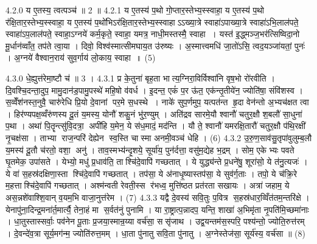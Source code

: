 4.2.0
य ए॒तस्य॒ त्वत्पञ्च॑ ॥ 2 ॥
4.2.1
य ए॒तस्य॑ प॒थो गो॒प्तार॒स्तेभ्य॒स्स्वाहा॒ य ए॒तस्य॑ प॒थो र॑क्षि॒तार॒स्तेभ्य॒स्स्वाहा॒ य ए॒तस्य॑ प॒थो॑भिऽर॑क्षि॒तार॒स्तेभ्य॒स्स्वाहाऽऽख्या॒त्रे स्वाहा॑ऽपाख्या॒त्रे स्वाहा॑ऽभि॒लाल॑पते॒ स्वाहा॑ऽप॒लाल॑पते॒ स्वाहा॒ऽग्नये॑ कर्म॒कृते॒ स्वाहा॒ यमत्र॒ नाधी॒मस्तस्मै॒ स्वाहा । यस्त॑ इ॒द्ध्मञ्ज॒भर॑त्सिष्विदा॒नो मू॒र्धान॑व्वाँत॒ तप॑ते त्वा॒या । दिवो॒ विश्व॑स्मात्सीमघाय॒त उ॑रुष्यः । अ॒स्मात्त्वमधि॑ जा॒तो॑ऽसि॒ त्वद॒यञ्जा॑यतां॒ पुनः॑ । अ॒ग्नये॑ वैश्वान॒राय॑ सुव॒र्गाय॑ लो॒काय॒ स्वाहा ॥ (5)
\anuvakamend

4.3.0
धे॒ह्युत्त॑रेमा॒ष्टौ च॑ ॥ 3 ।
4.3.1
प्र के॒तुना॑ बृह॒ता भात्य॒ग्निरा॒विर्विश्वा॑नि वृष॒भो रो॑रवीति । दि॒वश्चि॒दन्ता॒दुप॒ मामु॒दान॑ड॒पामु॒पस्थे॑ महि॒षो व॑वर्ध । इ॒दन्त॒ एकं॑ प॒र ऊ॑त॒ एक॑न्तृ॒तीये॑न॒ ज्योति॑षा॒ संवि॑शस्व । स॒व्वेँश॑नस्त॒नुवै॒ चारु॑रेधि प्रि॒यो दे॒वानां पर॒मे स॒धस्थे । नाके॑ सुप॒र्णमुप॒ यत्पत॑न्त हृ॒दा वेन॑न्तो अ॒भ्यच॑क्षत त्वा । हिर॑ण्यपक्ष॒व्वँरु॑णस्य दू॒तं य॒मस्य॒ योनौ॑ शकु॒नं भु॑र॒ण्युम् । अति॑द्रव सारमे॒यौ श्वानौ॑ चतुर॒क्षौ श॒बलौ॑ सा॒धुना॑ प॒था । अथा॑ पि॒तॄन्त्सु॑वि॒दत्रा॒ अपी॑हि य॒मेन॒ ये स॑ध॒मादं॒ मद॑न्ति । यौ ते॒ श्वानौ॑ यमरक्षि॒तारौ॑ चतुर॒क्षौ प॑थि॒रक्षी॑ नृ॒चक्ष॑सा । ताभ्या राज॒न्परि॑ देह्येन स्व॒स्ति चास्मा अनमी॒वञ्च॑ धेहि । (6)
4.3.2
उ॒रु॒ण॒साव॑सु॒तृपा॑वुलुम्ब॒लौ य॒मस्य॑ दू॒तौ च॑रतो॒ वशा॒ अनु॑ । ताव॒स्मभ्य॑न्दृ॒शये॒ सूर्या॑य॒ पुन॑र्दत्ता॒ वसु॑म॒द्येह भ॒द्रम् । सोम॒ एकेभ्यः पवते घृ॒तमेक॒ उपा॑सते । येभ्यो॒ मधु॑ प्र॒धाव॑ति॒ ताश्चि॑दे॒वापि॑ गच्छतात् । ये युद्ध्य॑न्ते प्र॒धने॑षु॒ शूरा॑सो॒ ये त॑नु॒त्यजः॑ । ये वा॑ स॒हस्र॑दक्षिणा॒स्ता श्चि॑दे॒वापि॑ गच्छतात् । तप॑सा॒ ये अ॑नाधृ॒ष्यास्तप॑सा॒ ये सुव॑र्ग॒ताः । तपो॒ ये च॑क्रि॒रे म॒हत्ताश्चि॑दे॒वापि॑ गच्छतात् । अश्म॑न्वती रेवती॒स्स र॑भध्व॒ मुत्ति॑ष्ठत प्रत॑रता सखायः । अत्रा॑ जहाम॒ ये अस॒न्नशे॑वाश्शि॒वान् व॒यम॒भि वाजा॒नुत्त॑रेम । (7)
4.3.3
यद्वै दे॒वस्य॑ सवि॒तुः प॒वित्र स॒हस्र॑धार॒व्विँत॑तम॒न्तरि॑क्षे । येनापु॑ना॒दिन्द्र॒मना॑र्त॒मार्त्यै॒ तेना॒हं मा स॒र्वत॑नुं पुनामि । या रा॒ष्ट्रात्प॒न्नादप॒ यन्ति॒ शाखा॑ अ॒भिमृ॑ता नृ॒पति॑मि॒च्छमा॑नाः । धा॒तुस्तास्सर्वाः॒ पव॑नेन पू॒ताः प्र॒जया॒स्मान्र॒य्या वर्च॑सा॒ ससृ॑जाथ । उद्व॒यन्तम॑स॒स्परि॒ पश्य॑न्तो॒ ज्योति॒रुत्त॑रम् । दे॒वन्दे॑व॒त्रा सूर्य॒मग॑न्म॒ ज्योति॑रुत्त॒मम् । धा॒ता पु॑नातु सवि॒ता पु॑नातु । अ॒ग्नेस्तेज॑सा॒ सूर्य॑स्य॒ वर्च॑सा ॥ (8)
\anuvakamend

